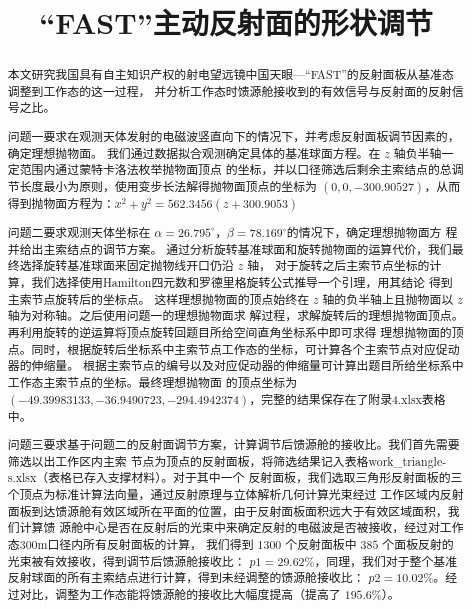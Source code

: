\documentclass[withoutpreface,bwprint]{cumcmthesis} %
\title{“FAST”主动反射面的形状调节}
\begin{document}
\maketitle
\begin{abstract}
本文研究我国具有自主知识产权的射电望远镜中国天眼---“FAST”的反射面板从基准态调整到工作态的这一过程，
并分析工作态时馈源舱接收到的有效信号与反射面的反射信号之比。

问题一要求在观测天体发射的电磁波竖直向下的情况下，并考虑反射面板调节因素的，确定理想抛物面。
我们通过数据拟合观测确定具体的基准球面方程。在 $z$ 轴负半轴一定范围内通过蒙特卡洛法枚举抛物面顶点
的坐标，并以口径筛选后剩余主索结点的总调节长度最小为原则，使用变步长法解得抛物面顶点的坐标为
$(0,0,-300.90527)$，从而得到抛物面方程为：$x^2+y^2=562.3456(z+300.9053)$

问题二要求观测天体坐标在 $\alpha =26.795^\circ，\beta =78.169^\circ$的情况下，确定理想抛物面方
程并给出主索结点的调节方案。
通过分析旋转基准球面和旋转抛物面的运算代价，我们最终选择旋转基准球面来固定抛物线开口仍沿 $z$ 轴，
对于旋转之后主索节点坐标的计算，我们选择使用Hamilton四元数和罗德里格旋转公式推导一个引理，用其结论
得到主索节点旋转后的坐标点。
这样理想抛物面的顶点始终在 $z$ 轴的负半轴上且抛物面以 $z$ 轴为对称轴。之后使用问题一的理想抛物面求
解过程，求解旋转后的理想抛物面顶点。再利用旋转的逆运算将顶点旋转回题目所给空间直角坐标系中即可求得
理想抛物面的顶点。同时，根据旋转后坐标系中主索节点工作态的坐标，可计算各个主索节点对应促动器的伸缩量。
根据主索节点的编号以及对应促动器的伸缩量可计算出题目所给坐标系中工作态主索节点的坐标。最终理想抛物面
的顶点坐标为 $(-49.39983133,-36.9490723,-294.4942374)$，完整的结果保存在了附录4.xlsx表格中。

问题三要求基于问题二的反射面调节方案，计算调节后馈源舱的接收比。我们首先需要筛选以出工作区内主索
节点为顶点的反射面板，将筛选结果记入表格work\_triangle-s.xlsx（表格已存入支撑材料）。对于其中一个
反射面板，我们选取三角形反射面板的三个顶点为标准计算法向量，通过反射原理与立体解析几何计算光束经过
工作区域内反射面板到达馈源舱有效区域所在平面的位置，由于反射面板面积远大于有效区域面积，我们计算馈
源舱中心是否在反射后的光束中来确定反射的电磁波是否被接收，经过对工作态300m口径内所有反射面板的计算，
我们得到 $1300$ 个反射面板中 $385$ 个面板反射的光束被有效接收，得到调节后馈源舱接收比：
$p1 = 29.62\%$，同理，我们对于整个基准反射球面的所有主索结点进行计算，得到未经调整的馈源舱接收比：
$p2 = 10.02\%$。经过对比，调整为工作态能将馈源舱的接收比大幅度提高（提高了 $195.6\%$）。

\end{abstract}
\end{document}
